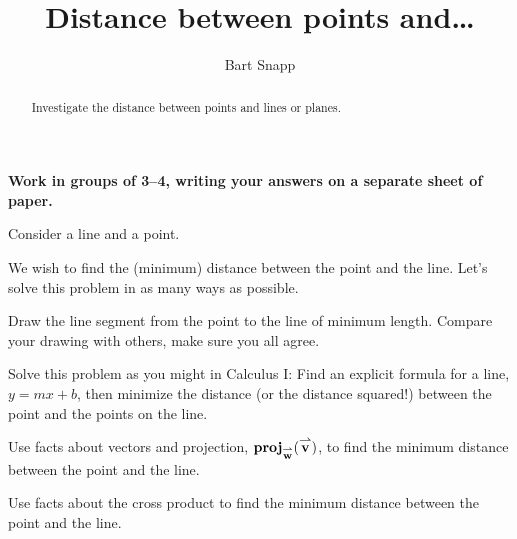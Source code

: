\documentclass[handout,nooutcomes,noauthor]{ximera}
\author{Bart Snapp}
\title[Collaborate:]{Distance between points and\dots}
\begin{document}
\begin{abstract}
  Investigate the distance between points and lines or planes. 
\end{abstract}
\maketitle

\textbf{Work in groups of 3--4, writing your answers on a separate
  sheet of paper.}

Consider a line and a point.
\begin{image}
\end{image}
We wish to find the (minimum) distance between the point and the
line. Let's solve this problem in as many ways as possible.

\begin{problem}
  Draw the line segment from the point to the line of minimum
  length. Compare your drawing with others, make sure you all agree.
\end{problem}


\begin{problem}
  Solve this problem as you might in Calculus I: Find an explicit
  formula for a line, $y = mx+b$, then minimize the distance (or the
  distance squared!) between the point and the points on the line.
\end{problem}

\begin{problem}
  Use facts about vectors and projection, $\operatorname{\mathbf{proj}}_{{\overset{\boldsymbol{\rightharpoonup}}{\mathbf{w}}}}({\overset{\boldsymbol{\rightharpoonup}}{\mathbf{v}}})$,
  to find the minimum distance between the point and the line.
\end{problem}

\begin{problem}
  Use facts about the cross product to find the minimum distance
  between the point and the line.
\end{problem}
\end{document}
